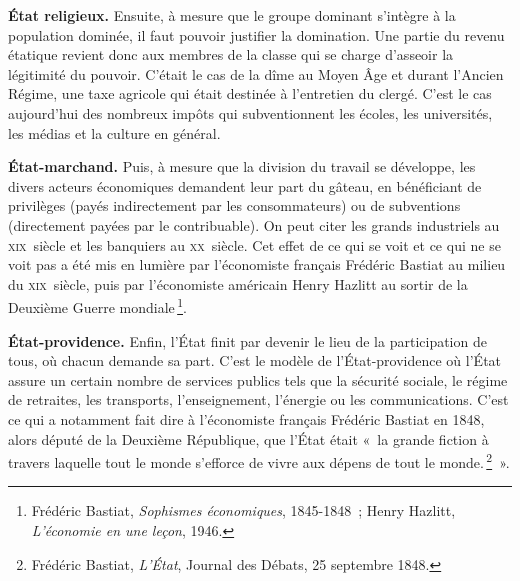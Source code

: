 \documentclass[a4paper,notitlepage]{article}
\newcommand{\sfootnote}{\,\footnote}
\begin{document}
\textbf{État religieux.} Ensuite, à mesure que le groupe dominant s'intègre à la population dominée, il faut pouvoir justifier la domination. Une partie du revenu étatique revient donc aux membres de la classe qui se charge d'asseoir la légitimité du pouvoir. C'était le cas de la dîme au Moyen Âge et durant l'Ancien Régime, une taxe agricole qui était destinée à l'entretien du clergé. C'est le cas aujourd'hui des nombreux impôts qui subventionnent les écoles, les universités, les médias et la culture en général.

\textbf{État-marchand.} Puis, à mesure que la division du travail se développe, les divers acteurs économiques demandent leur part du gâteau, en bénéficiant de privilèges (payés indirectement par les consommateurs) ou de subventions (directement payées par le contribuable). On peut citer les grands industriels au \textsc{xix}\ieme{}~siècle et les banquiers au \textsc{xx}\ieme{}~siècle. Cet effet de ce qui se voit et ce qui ne se voit pas a été mis en lumière par l'économiste français Frédéric Bastiat au milieu du \textsc{xix}\ieme{}~siècle, puis par l'économiste américain Henry Hazlitt au sortir de la Deuxième Guerre mondiale\sfootnote{Frédéric Bastiat, \emph{Sophismes économiques}, 1845-1848~; Henry Hazlitt, \emph{L'économie en une leçon}, 1946.}.

\textbf{État-providence.} Enfin, l'État finit par devenir le lieu de la participation de tous, où chacun demande sa part. C'est le modèle de l'État-providence où l'État assure un certain nombre de services publics tels que la sécurité sociale, le régime de retraites, les transports, l'enseignement, l'énergie ou les communications. C'est ce qui a notamment fait dire à l'économiste français Frédéric Bastiat en 1848, alors député de la Deuxième République, que l'État était «~la grande fiction à travers laquelle tout le monde s'efforce de vivre aux dépens de tout le monde.\sfootnote{Frédéric Bastiat, \emph{L'État}, Journal des Débats, 25 septembre 1848.}~». %
\end{document}

